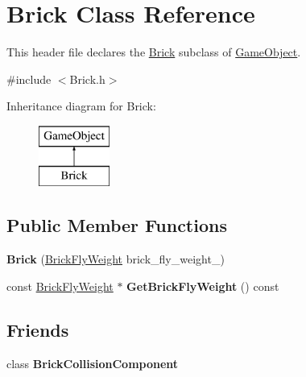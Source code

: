 \hypertarget{class_brick}{}\section{Brick Class Reference}
\label{class_brick}


This header file declares the \hyperlink{class_brick}{Brick} subclass of \hyperlink{class_game_object}{Game\+Object}.  




{\ttfamily \#include $<$Brick.\+h$>$}

Inheritance diagram for Brick\+:\begin{figure}[H]
\begin{center}
\leavevmode
\includegraphics[height=2.000000cm]{class_brick}
\end{center}
\end{figure}
\subsection*{Public Member Functions}
\begin{DoxyCompactItemize}
\item 
\hypertarget{class_brick_af7fc5d103be6a189107ad348b097c79d}{}{\bfseries Brick} (\hyperlink{class_brick_fly_weight}{Brick\+Fly\+Weight} brick\+\_\+fly\+\_\+weight\+\_\+)\label{class_brick_af7fc5d103be6a189107ad348b097c79d}

\item 
\hypertarget{class_brick_a491c5e8532641813149eaba714dc067d}{}const \hyperlink{class_brick_fly_weight}{Brick\+Fly\+Weight} $\ast$ {\bfseries Get\+Brick\+Fly\+Weight} () const \label{class_brick_a491c5e8532641813149eaba714dc067d}

\end{DoxyCompactItemize}
\subsection*{Friends}
\begin{DoxyCompactItemize}
\item 
\hypertarget{class_brick_abbe1e4d04c25e93f121c0b0b0bba6dbd}{}class {\bfseries Brick\+Collision\+Component}\label{class_brick_abbe1e4d04c25e93f121c0b0b0bba6dbd}

\end{DoxyCompactItemize}
